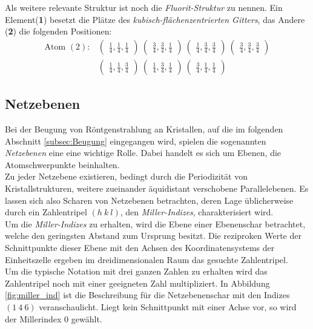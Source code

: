 Als weitere relevante Struktur ist noch die
\textit{Fluorit-Struktur} zu nennen.
Ein Element(\textbf{1}) besetzt die Plätze des
\textit{kubisch-flächenzentrierten Gitters},
das Andere (\textbf{2}) die folgenden
Positionen:
\begin{align}
\label{eqn:9*}
\text{Atom }(2) :&
\begin{pmatrix}
\frac{1}{4}, \frac{1}{4}, \frac{1}{4}
\end{pmatrix}\
\begin{pmatrix}
\frac{3}{4}, \frac{3}{4}, \frac{1}{4}
\end{pmatrix}\
\begin{pmatrix}
\frac{1}{4}, \frac{3}{4}, \frac{3}{4}
\end{pmatrix}\
\begin{pmatrix}
\frac{3}{4}, \frac{3}{4}, \frac{3}{4}
\end{pmatrix}\\
&\begin{pmatrix}
\frac{1}{4}, \frac{1}{4}, \frac{3}{4}
\end{pmatrix}\
\begin{pmatrix}
\frac{1}{4}, \frac{3}{4}, \frac{1}{4}
\end{pmatrix}\
\begin{pmatrix}
\frac{3}{4}, \frac{1}{4}, \frac{1}{4}
\end{pmatrix}\
\end{align}

\subsection{Netzebenen}
\label{subsec:netzebenen}
Bei der Beugung von Röntgenstrahlung an Kristallen,
auf die im folgenden Abschnitt \ref{subsec:Beugung}
eingegangen wird, spielen die sogenannten \textit{Netzebenen}
eine eine wichtige Rolle. Dabei handelt es sich
um Ebenen, die Atomschwerpunkte beinhalten.\\
Zu jeder Netzebene existieren, bedingt durch die
Periodizität von Kristallstrukturen, weitere zueinander
äquidistant verschobene Parallelebenen.
Es lassen sich also Scharen von Netzebenen betrachten,
deren Lage üblicherweise durch ein Zahlentripel $(h \ k \ l)$,
den \textit{Miller-Indizes}, charakterisiert wird.\\
Um die \textit{Miller-Indizes} zu erhalten, wird die
Ebene einer Ebenenschar betrachtet, welche den geringsten
Abstand zum Ursprung besitzt. Die reziproken Werte
der Schnittpunkte dieser Ebene mit den Achsen des
Koordinatensystems der Einheitszelle ergeben im
dreidimensionalen Raum das gesuchte Zahlentripel.\\
Um die typische Notation mit drei ganzen Zahlen zu erhalten
wird das Zahlentripel noch mit einer geeigneten Zahl
multipliziert. In Abbildung \ref{fig:miller_ind}
ist die Beschreibung für die Netzebenenschar mit den
Indizes $(1 \ 4 \ 6)$ veranschaulicht.
Liegt kein Schnittpunkt mit einer
Achse vor, so wird der Millerindex $0$ gewählt.

